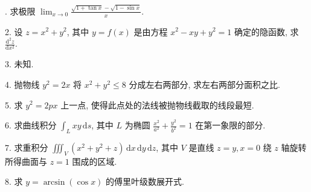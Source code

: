 \documentclass{examcollection}
\begin{document}
{\begin{minipage}{\textwidth}
. 求极限 $\lim_{x\to 0}\frac{\sqrt{1 + \tan x} - \sqrt{1 - \sin x}}{x}$.\par
2. 设 $z = x^{2} + y^{2}$, 其中 $y = f(x)$ 是由方程 $x^{2} - xy + y^{2} = 1$ 确定的隐函数, 求 $\frac{\mathrm{d}^2z}{\mathrm{d}x^2}$.\par
3. 未知.\par
4. 抛物线 $y^{2} = 2x$ 将 $x^{2} + y^{2} \leq 8$ 分成左右两部分, 求左右两部分面积之比.\par
5. 求 $y^{2} = 2px$ 上一点, 使得此点处的法线被抛物线截取的线段最短.\par
6. 求曲线积分 $\int_{L} xy \, \mathrm{d}s$, 其中 $L$ 为椭圆 $\frac{x^2}{a^2} + \frac{y^2}{b^2} = 1$ 在第一象限的部分.\par
7. 求重积分 $\iiint_{V} (x^{2} + y^{2} + z) \, \mathrm{d}x \, \mathrm{d}y \, \mathrm{d}z$, 其中 $V$ 是直线 $z = y, x = 0$ 绕 $z$ 轴旋转所得曲面与 $z = 1$ 围成的区域.\par
8. 求  $y = \arcsin(\cos x)$  的傅里叶级数展开式.\par
\end{minipage}}
\ifdim\dimexpr\ht\proofbox+\dp\proofbox\relax>\textheight
\noindent\resizebox{!}{\textheight}{\usebox{\proofbox}}\else\noindent\usebox{\proofbox}\fi\clearpage
\end{document}
